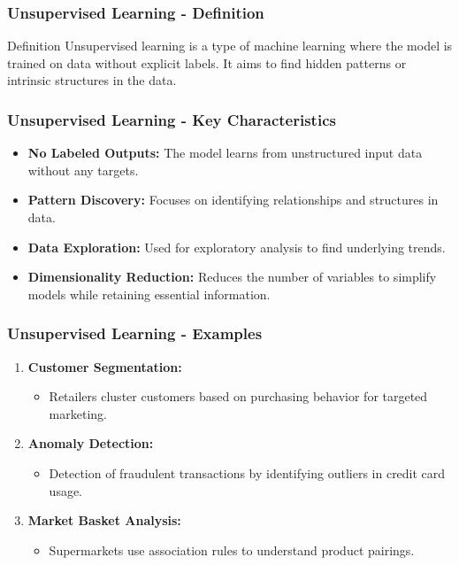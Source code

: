 \documentclass[aspectratio=169]{beamer}
\begin{document}
\begin{frame}[fragile]
    \frametitle{Unsupervised Learning - Definition}
    \begin{block}{Definition}
        Unsupervised learning is a type of machine learning where the model is trained on data without explicit labels. 
        It aims to find hidden patterns or intrinsic structures in the data.
    \end{block}
\end{frame}

\begin{frame}[fragile]
    \frametitle{Unsupervised Learning - Key Characteristics}
    \begin{itemize}
        \item \textbf{No Labeled Outputs:} The model learns from unstructured input data without any targets.
        \item \textbf{Pattern Discovery:} Focuses on identifying relationships and structures in data.
        \item \textbf{Data Exploration:} Used for exploratory analysis to find underlying trends.
        \item \textbf{Dimensionality Reduction:} Reduces the number of variables to simplify models while retaining essential information.
    \end{itemize}
\end{frame}

\begin{frame}[fragile]
    \frametitle{Unsupervised Learning - Examples}
    \begin{enumerate}
        \item \textbf{Customer Segmentation:}
            \begin{itemize}
                \item Retailers cluster customers based on purchasing behavior for targeted marketing.
            \end{itemize}
        \item \textbf{Anomaly Detection:}
            \begin{itemize}
                \item Detection of fraudulent transactions by identifying outliers in credit card usage.
            \end{itemize}
        \item \textbf{Market Basket Analysis:}
            \begin{itemize}
                \item Supermarkets use association rules to understand product pairings.
            \end{itemize}
    \end{enumerate}
\end{frame}
\end{document}
